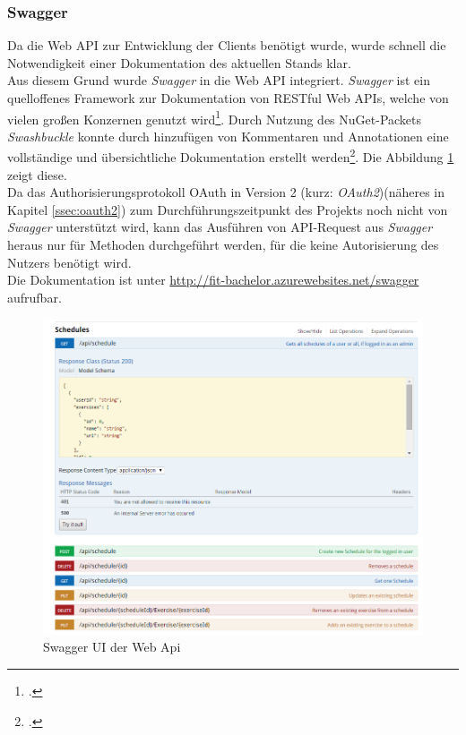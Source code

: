 \subsubsection*{Swagger}
\label{sssec:Swagger}
Da die Web \ac{API} zur Entwicklung der Clients benötigt wurde, wurde schnell die Notwendigkeit einer Dokumentation des aktuellen Stands klar. \\
Aus diesem Grund wurde \textit{Swagger} in die Web \ac{API} integriert. \textit{Swagger} ist ein quelloffenes Framework zur Dokumentation von \ac{REST}ful Web \ac{API}s, welche von vielen großen Konzernen genutzt wird\footcite{swagger}. Durch Nutzung des \gls{NuGet}-Packets \textit{Swashbuckle} konnte durch hinzufügen von Kommentaren und Annotationen eine vollständige und übersichtliche Dokumentation erstellt werden\footcite{implementing-Swagger}. Die Abbildung \ref{pic:swagger-UI} zeigt diese. \\
Da das Authorisierungsprotokoll OAuth in Version 2 (kurz: \textit{OAuth2})(näheres in Kapitel \ref{ssec:oauth2}) zum Durchführungszeitpunkt des Projekts noch nicht von \textit{Swagger} unterstützt wird, kann das Ausführen von API-Request aus \textit{Swagger} heraus nur für Methoden durchgeführt werden, für die keine Autorisierung des Nutzers benötigt wird. \\
Die Dokumentation ist unter \href{http://fit-bachelor.azurewebsites.net/swagger}{http://fit-bachelor.azurewebsites.net/swagger} aufrufbar. 
\begin{figure}[h]
\centering
\includegraphics[width=0.8\linewidth]{content/images/Swagger-UI-fIT}
\caption{Swagger UI der Web Api}
\label{pic:swagger-UI}
\end{figure}


